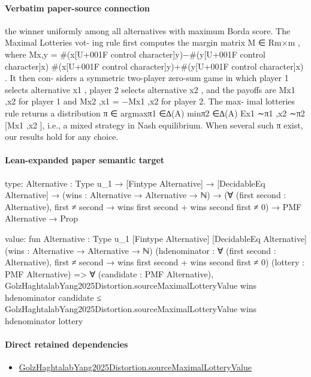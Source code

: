 \documentclass[10pt]{article}
\begin{document}
\paragraph{Verbatim paper-source connection}
\begin{ReviewVerbatim}
the winner uniformly among all alternatives with maximum Borda score. The Maximal Lotteries vot-
ing rule first computes the margin matrix M ∈ Rm×m , where Mx,y = #(x[U+001F control character]y)−#(y[U+001F control character]x)
                                                                          #(x[U+001F control character]y)+#(y[U+001F control character]x) . It then con-
siders a symmetric two-player zero-sum game in which player 1 selects alternative x1 , player 2 selects
alternative x2 , and the payoffs are Mx1 ,x2 for player 1 and Mx2 ,x1 = −Mx1 ,x2 for player 2. The max-
imal lotteries rule returns a distribution π ∈ argmaxπ1 ∈∆(A) minπ2 ∈∆(A) Ex1 ∼π1 ,x2 ∼π2 [Mx1 ,x2 ],
i.e., a mixed strategy in Nash equilibrium. When several such π exist, our results hold for any choice.
\end{ReviewVerbatim}



\paragraph{Lean-expanded paper semantic target}
\begin{ReviewVerbatim}
type:
{Alternative : Type u_1} →
  [Fintype Alternative] →
    [DecidableEq Alternative] →
      (wins : Alternative → Alternative → ℕ) →
        (∀ (first second : Alternative), first ≠ second → wins first second + wins second first ≠ 0) →
          PMF Alternative → Prop

value:
fun {Alternative : Type u_1} [Fintype Alternative] [DecidableEq Alternative] (wins : Alternative → Alternative → ℕ)
    (hdenominator : ∀ (first second : Alternative), first ≠ second → wins first second + wins second first ≠ 0)
    (lottery : PMF Alternative) =>
  ∀ (candidate : PMF Alternative),
    GolzHaghtalabYang2025Distortion.sourceMaximalLotteryValue wins hdenominator candidate ≤
      GolzHaghtalabYang2025Distortion.sourceMaximalLotteryValue wins hdenominator lottery
\end{ReviewVerbatim}

\paragraph{Direct retained dependencies}
\begin{itemize}\raggedright
\item \hyperlink{paper-prerequisite-bbe7079711c4e442}{Golz\allowbreak{}Haghtalab\allowbreak{}Yang2025\allowbreak{}Distortion.\allowbreak{}source\allowbreak{}Maximal\allowbreak{}Lottery\allowbreak{}Value}
\end{itemize}
\end{document}
